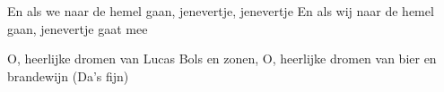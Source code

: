 \begin{verse*}
En als we naar de hemel gaan,
jenevertje, jenevertje
En als wij naar de hemel gaan,
jenevertje gaat mee
\end{verse*}

\begin{verse*}
O, heerlijke dromen van Lucas Bols en zonen,
O, heerlijke dromen van bier en brandewijn (Da's fijn)
\end{verse*}
